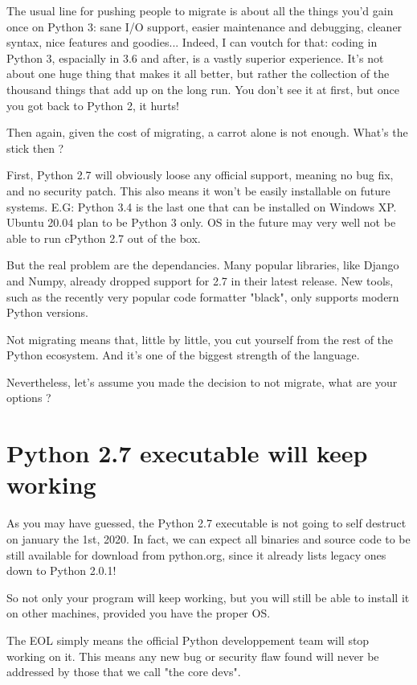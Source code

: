 The usual line for pushing people to migrate is about all the things you'd gain once on Python 3: sane I/O support, easier maintenance and debugging, cleaner syntax, nice features and goodies... Indeed, I can voutch for that: coding in Python 3, espacially in 3.6 and after, is a vastly superior experience. It's not about one huge thing that makes it all better, but rather the collection of the thousand things that add up on the long run. You don't see it at first, but once you got back to Python 2, it hurts!

Then again, given the cost of migrating, a carrot alone is not enough. What's the stick then ?

First, Python 2.7 will obviously loose any official support, meaning no bug fix, and no security patch. This also means it won't be easily installable on future systems. E.G: Python 3.4 is the last one that can be installed on Windows XP. Ubuntu 20.04 plan to be Python 3 only. OS in the future may very well not be able to run cPython 2.7 out of the box.

But the real problem are the dependancies. Many popular libraries, like Django and Numpy, already dropped support for 2.7 in their latest release. New tools, such as the recently very popular code formatter "black", only supports modern Python versions.

Not migrating means that, little by little, you cut yourself from the rest of the Python ecosystem. And it's one of the biggest strength of the language.

Nevertheless, let's assume you made the decision to not migrate, what are your options ?

\section{Python 2.7 executable will keep working}

As you may have guessed, the Python 2.7 executable is not going to self destruct on january the 1st, 2020. In fact, we can expect all binaries and source code to be still available for download from python.org, since it already lists legacy ones down to Python 2.0.1!

So not only your program will keep working, but you will still be able to install it on other machines, provided you have the proper OS.

The \gls{EOL} simply means the official Python developpement team will stop working on it. This means any new bug or security flaw found will never be addressed by those that we call "the core devs".

